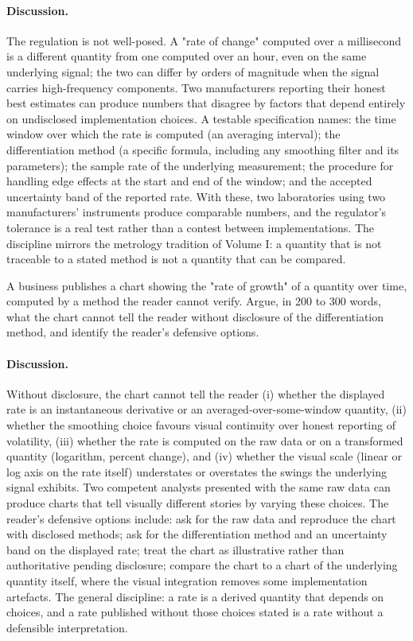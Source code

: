 \paragraph{Discussion.}
The regulation is not well-posed. A "rate of change" computed
over a millisecond is a different quantity from one computed over
an hour, even on the same underlying signal; the two can differ
by orders of magnitude when the signal carries high-frequency
components. Two manufacturers reporting their honest best
estimates can produce numbers that disagree by factors that
depend entirely on undisclosed implementation choices. A testable
specification names: the time window over which the rate is
computed (an averaging interval); the differentiation method (a
specific formula, including any smoothing filter and its
parameters); the sample rate of the underlying measurement; the
procedure for handling edge effects at the start and end of the
window; and the accepted uncertainty band of the reported rate.
With these, two laboratories using two manufacturers' instruments
produce comparable numbers, and the regulator's tolerance is a
real test rather than a contest between implementations. The
discipline mirrors the metrology tradition of Volume I: a
quantity that is not traceable to a stated method is not a
quantity that can be compared.

\begin{exercise}
A business publishes a chart showing the "rate of growth" of a
quantity over time, computed by a method the reader cannot
verify. Argue, in 200 to 300 words, what the chart cannot tell
the reader without disclosure of the differentiation method, and
identify the reader's defensive options.
\end{exercise}

\paragraph{Discussion.}
Without disclosure, the chart cannot tell the reader (i) whether
the displayed rate is an instantaneous derivative or an
averaged-over-some-window quantity, (ii) whether the smoothing
choice favours visual continuity over honest reporting of
volatility, (iii) whether the rate is computed on the raw data
or on a transformed quantity (logarithm, percent change), and
(iv) whether the visual scale (linear or log axis on the rate
itself) understates or overstates the swings the underlying
signal exhibits. Two competent analysts presented with the same
raw data can produce charts that tell visually different stories
by varying these choices. The reader's defensive options
include: ask for the raw data and reproduce the chart with
disclosed methods; ask for the differentiation method and an
uncertainty band on the displayed rate; treat the chart as
illustrative rather than authoritative pending disclosure;
compare the chart to a chart of the underlying quantity itself,
where the visual integration removes some implementation
artefacts. The general discipline: a rate is a derived quantity
that depends on choices, and a rate published without those
choices stated is a rate without a defensible interpretation.

